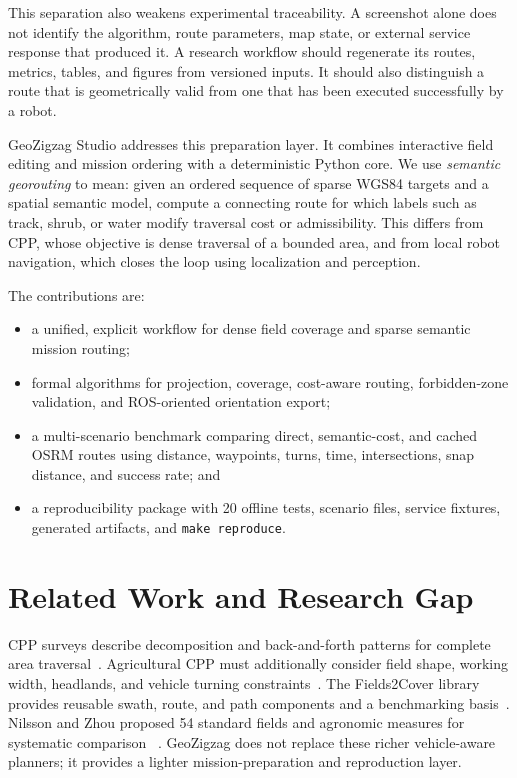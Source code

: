 \documentclass[conference,a4paper]{IEEEtran}
\begin{document}
This separation also weakens experimental traceability. A screenshot alone
does not identify the algorithm, route parameters, map state, or external
service response that produced it. A research workflow should regenerate its
routes, metrics, tables, and figures from versioned inputs. It should also
distinguish a route that is geometrically valid from one that has been executed
successfully by a robot.

GeoZigzag Studio addresses this preparation layer. It combines interactive
field editing and mission ordering with a deterministic Python core. We use
\emph{semantic georouting} to mean: given an ordered sequence of sparse WGS84
targets and a spatial semantic model, compute a connecting route for which
labels such as track, shrub, or water modify traversal cost or admissibility.
This differs from CPP, whose objective is dense traversal of a bounded area,
and from local robot navigation, which closes the loop using localization and
perception.

The contributions are:
\begin{itemize}
  \item a unified, explicit workflow for dense field coverage and sparse
  semantic mission routing;
  \item formal algorithms for projection, coverage, cost-aware routing,
  forbidden-zone validation, and ROS-oriented orientation export;
  \item a multi-scenario benchmark comparing direct, semantic-cost, and cached
  OSRM routes using distance, waypoints, turns, time, intersections, snap
  distance, and success rate; and
  \item a reproducibility package with 20 offline tests, scenario files,
  service fixtures, generated artifacts, and \texttt{make reproduce}.
\end{itemize}

\section{Related Work and Research Gap}
CPP surveys describe decomposition and back-and-forth patterns for complete
area traversal~\cite{choset2001coverage,galceran2013survey}. Agricultural CPP
must additionally consider field shape, working width, headlands, and vehicle
turning constraints~\cite{oksanen2009coverage,hoffmann2024guidance}. The
Fields2Cover library provides reusable swath, route, and path components and a
benchmarking basis~\cite{mier2023fields2cover}. Nilsson and Zhou proposed 54
standard fields and agronomic measures for systematic comparison
~\cite{nilsson2020benchmark}. GeoZigzag does not replace these richer
vehicle-aware planners; it provides a lighter mission-preparation and
reproduction layer.
\end{document}
